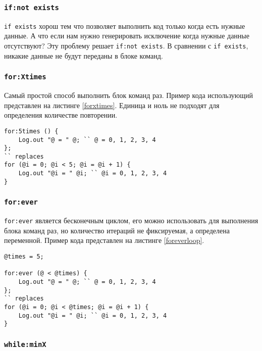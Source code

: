 \subsubsection{\lstinline|if:not exists|}

\lstinline|if exists| хорош тем что позволяет выполнить код только когда есть нужные данные. А что если нам нужно генерировать исключение когда нужные данные отсутствуют? Эту проблему решает \lstinline|if:not exists|. В сравнении с \lstinline|if exists|, никакие данные не будут переданы в блоке команд.

\subsubsection{\lstinline|for:Xtimes|}

Самый простой способ выполнить блок команд  раз. Пример кода использующий  представлен на листинге \ref{forxtimes}. Единица и ноль не подходят для определения количестве повторении.

\begin{lstlisting}[caption=Использование for:Xtimes, label=forxtimes]
for:5times () {
	Log.out "@ = " @; `` @ = 0, 1, 2, 3, 4
};
`` replaces
for (@i = 0; @i < 5; @i = @i + 1) {
	Log.out "@i = " @i; `` @i = 0, 1, 2, 3, 4
}
\end{lstlisting}

\subsubsection{\lstinline|for:ever|}

\lstinline|for:ever| является бесконечным циклом, его можно использовать для выполнения блока команд  раз, но количество итераций не фиксируемая, а определена переменной. Пример кода представлен на листинге \ref{foreverloop}.

\begin{lstlisting}[caption=Использование for:ever, label=forxtimes]
@times = 5;

for:ever (@ < @times) {
	Log.out "@ = " @; `` @ = 0, 1, 2, 3, 4
};
`` replaces
for (@i = 0; @i < @times; @i = @i + 1) {
	Log.out "@i = " @i; `` @i = 0, 1, 2, 3, 4
}
\end{lstlisting}

\subsubsection{\lstinline|while:minX|}

